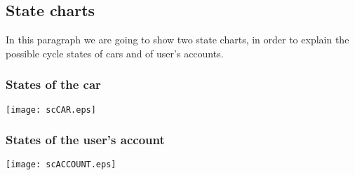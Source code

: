 \pagebreak
\subsection{State charts}
In this paragraph we are going to show two state charts, in order to explain the possible cycle states of cars and of user's accounts. 
\subsubsection{States of the car}
	\centerline{
		\vspace{0.2in}
			\texttt{[image: scCAR.eps]}
	}

\subsubsection{States of the user's account}
	\centerline{
		\vspace{0.2in}
			\texttt{[image: scACCOUNT.eps]}
	}
